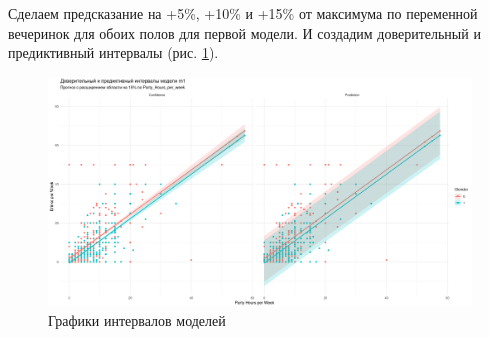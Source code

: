 Сделаем предсказание на +5\%, +10\% и +15\% от максимума по переменной вечеринок для обоих полов для первой модели. И создадим доверительный и предиктивный интервалы (рис. \ref{fig:intervals}).
\begin{figure}[h]  %
	\centering
	\includegraphics[height=0.6\textwidth]{imgs/intervals.png}  %
	\caption{Графики интервалов моделей}  %
	\label{fig:intervals}  %
\end{figure}

